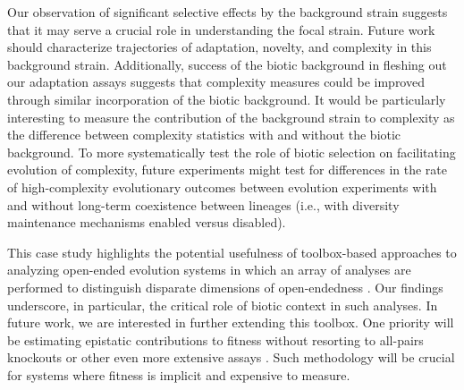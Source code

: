 Our observation of significant selective effects by the background strain suggests that it may serve a crucial role in understanding the focal strain.
Future work should characterize trajectories of adaptation, novelty, and complexity in this background strain.
Additionally, success of the biotic background in fleshing out our adaptation assays suggests that complexity measures could be improved through similar incorporation of the biotic background.
It would be particularly interesting to measure the contribution of the background strain to complexity as the difference between complexity statistics with and without the biotic background.
To more systematically test the role of biotic selection on facilitating evolution of complexity, future experiments might test for differences in the rate of high-complexity evolutionary outcomes between evolution experiments with and without long-term coexistence between lineages (i.e., with diversity maintenance mechanisms enabled versus disabled).

This case study highlights the potential usefulness of toolbox-based approaches to analyzing open-ended evolution systems in which an array of analyses are performed to distinguish disparate dimensions of open-endedness \citep{dolson2019modes}.
Our findings underscore, in particular, the critical role of biotic context in such analyses.
In future work, we are interested in further extending this toolbox.
One priority will be estimating epistatic contributions to fitness without resorting to all-pairs knockouts or other even more extensive assays \citep{moreno2024methods}.
Such methodology will be crucial for systems where fitness is implicit and expensive to measure.









